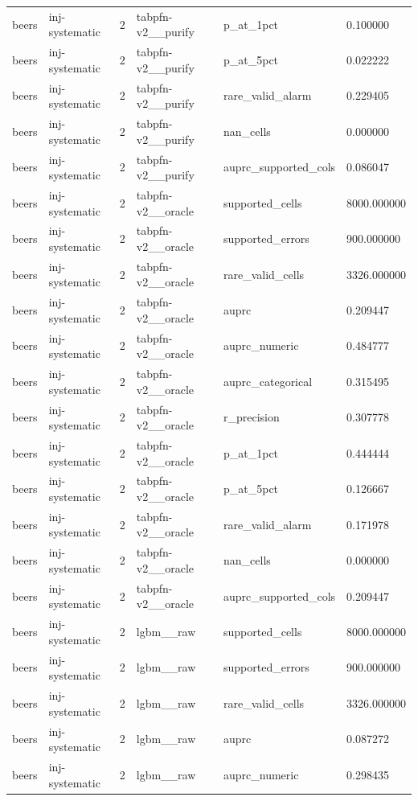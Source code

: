 \begin{tabular}{llllll}
beers & inj-systematic & 2 & tabpfn-v2\_\_purify & p\_at\_1pct & 0.100000 \\
beers & inj-systematic & 2 & tabpfn-v2\_\_purify & p\_at\_5pct & 0.022222 \\
beers & inj-systematic & 2 & tabpfn-v2\_\_purify & rare\_valid\_alarm & 0.229405 \\
beers & inj-systematic & 2 & tabpfn-v2\_\_purify & nan\_cells & 0.000000 \\
beers & inj-systematic & 2 & tabpfn-v2\_\_purify & auprc\_supported\_cols & 0.086047 \\
beers & inj-systematic & 2 & tabpfn-v2\_\_oracle & supported\_cells & 8000.000000 \\
beers & inj-systematic & 2 & tabpfn-v2\_\_oracle & supported\_errors & 900.000000 \\
beers & inj-systematic & 2 & tabpfn-v2\_\_oracle & rare\_valid\_cells & 3326.000000 \\
beers & inj-systematic & 2 & tabpfn-v2\_\_oracle & auprc & 0.209447 \\
beers & inj-systematic & 2 & tabpfn-v2\_\_oracle & auprc\_numeric & 0.484777 \\
beers & inj-systematic & 2 & tabpfn-v2\_\_oracle & auprc\_categorical & 0.315495 \\
beers & inj-systematic & 2 & tabpfn-v2\_\_oracle & r\_precision & 0.307778 \\
beers & inj-systematic & 2 & tabpfn-v2\_\_oracle & p\_at\_1pct & 0.444444 \\
beers & inj-systematic & 2 & tabpfn-v2\_\_oracle & p\_at\_5pct & 0.126667 \\
beers & inj-systematic & 2 & tabpfn-v2\_\_oracle & rare\_valid\_alarm & 0.171978 \\
beers & inj-systematic & 2 & tabpfn-v2\_\_oracle & nan\_cells & 0.000000 \\
beers & inj-systematic & 2 & tabpfn-v2\_\_oracle & auprc\_supported\_cols & 0.209447 \\
beers & inj-systematic & 2 & lgbm\_\_raw & supported\_cells & 8000.000000 \\
beers & inj-systematic & 2 & lgbm\_\_raw & supported\_errors & 900.000000 \\
beers & inj-systematic & 2 & lgbm\_\_raw & rare\_valid\_cells & 3326.000000 \\
beers & inj-systematic & 2 & lgbm\_\_raw & auprc & 0.087272 \\
beers & inj-systematic & 2 & lgbm\_\_raw & auprc\_numeric & 0.298435 \\

\end{tabular}
